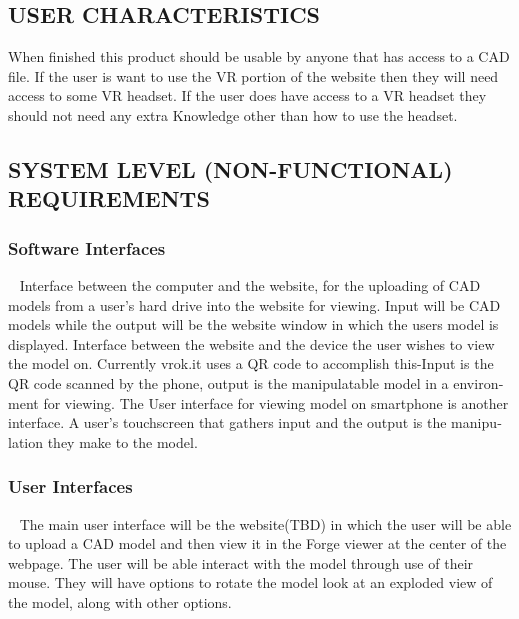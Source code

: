 \documentclass[letterpaper, 10pt, draftclsnofoot, compsoc, onecolumn]{IEEEtran}
\begin{document}
\subsection[USER
CHARACTERISTICS]{\rmfamily\bfseries\color{black}
USER CHARACTERISTICS}

{\color{black}
	When finished this product should be usable by anyone that has access to a CAD file. If the user is want to use the VR 
	portion of the website then they will need access to some VR headset. If the user does have access to a VR headset they 
	should not need any extra Knowledge other than how to use the headset.  
}

\subsection[SYSTEM LEVEL (NON{}-FUNCTIONAL)
REQUIREMENTS]{\rmfamily\bfseries\color{black}
SYSTEM LEVEL (NON-FUNCTIONAL) REQUIREMENTS}

\subsubsection[Software
Interfaces]{\rmfamily\bfseries\color{black}
Software Interfaces}
{\color{black}\foreignlanguage{english}{\ }\foreignlanguage{english}{
	Interface between the computer and the website, for the uploading of CAD models from a user's hard drive into the 
	website for viewing. Input will be CAD models while the output will be the website window in which the users model 
	is displayed. Interface between the website and the device the user wishes to view the model on. Currently vrok.it uses a 
	QR code to accomplish this-Input is the QR code scanned by the phone, output is the manipulatable model in a environment 
	for viewing. The User interface for viewing model on smartphone is another interface. A user's touchscreen that gathers 
	input and the output is the manipulation they make to the model.
}}

\subsubsection[User
Interfaces]{\rmfamily\bfseries\color{black}
User Interfaces}
{\color{black}
\foreignlanguage{english}{\ }\foreignlanguage{english}{
	The main user interface will be the website(TBD) in which the user will be able to upload a CAD model and then view it in 
	the Forge viewer at the center of the webpage. The user will be able interact with the model through use of their 
	mouse. They will have options to rotate the model look at an exploded view of the model, along with other options. 
}}
\end{document}
